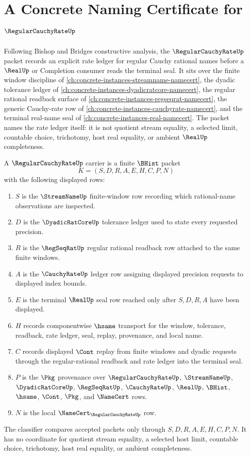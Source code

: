 \chapter{A Concrete Naming Certificate for $\RegularCauchyRateUp$}
\label{ch:concrete-instances-regular-cauchy-rate-namecert}

Following Bishop and Bridges constructive analysis, the $\RegularCauchyRateUp$ packet records an explicit rate ledger for regular Cauchy rational names before a $\RealUp$ or Completion consumer reads the terminal seal. It sits over the finite window discipline of \autoref{ch:concrete-instances-streamname-namecert}, the dyadic tolerance ledger of \autoref{ch:concrete-instances-dyadicratcore-namecert}, the regular rational readback surface of \autoref{ch:concrete-instances-regseqrat-namecert}, the generic Cauchy-rate row of \autoref{ch:concrete-instances-cauchyrate-namecert}, and the terminal real-name seal of \autoref{ch:concrete-instances-real-namecert}. The packet names the rate ledger itself: it is not quotient stream equality, a selected limit, countable choice, trichotomy, host real equality, or ambient $\RealUp$ completeness.

\begin{definition}
\label{def:regular-cauchy-rate-carrier}
A $\RegularCauchyRateUp$ carrier is a finite $\BHist$ packet
$$
K=(S,D,R,A,E,H,C,P,N)
$$
with the following displayed rows:
\begin{enumerate}
\item $S$ is the $\StreamNameUp$ finite-window row recording which rational-name observations are inspected.
\item $D$ is the $\DyadicRatCoreUp$ tolerance ledger used to state every requested precision.
\item $R$ is the $\RegSeqRatUp$ regular rational readback row attached to the same finite windows.
\item $A$ is the $\CauchyRateUp$ ledger row assigning displayed precision requests to displayed index bounds.
\item $E$ is the terminal $\RealUp$ seal row reached only after $S,D,R,A$ have been displayed.
\item $H$ records componentwise $\hsame$ transport for the window, tolerance, readback, rate ledger, seal, replay, provenance, and local name.
\item $C$ records displayed $\Cont$ replay from finite windows and dyadic requests through the regular-rational readback and rate ledger into the terminal seal.
\item $P$ is the $\Pkg$ provenance over $\RegularCauchyRateUp$, $\StreamNameUp$, $\DyadicRatCoreUp$, $\RegSeqRatUp$, $\CauchyRateUp$, $\RealUp$, $\BHist$, $\hsame$, $\Cont$, $\Pkg$, and $\NameCert$ rows.
\item $N$ is the local $\NameCert_{\RegularCauchyRateUp}$ row.
\end{enumerate}
The classifier compares accepted packets only through $S,D,R,A,E,H,C,P,N$. It has no coordinate for quotient stream equality, a selected host limit, countable choice, trichotomy, host real equality, or ambient completeness.
\end{definition}


